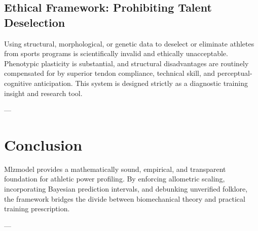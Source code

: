 \documentclass[11pt,a4paper]{article}
\begin{document}
\subsection{Ethical Framework: Prohibiting Talent Deselection}
Using structural, morphological, or genetic data to deselect or eliminate athletes from sports programs is scientifically invalid and ethically unacceptable. Phenotypic plasticity is substantial, and structural disadvantages are routinely compensated for by superior tendon compliance, technical skill, and perceptual-cognitive anticipation. This system is designed strictly as a diagnostic training insight and research tool.

---

\section{Conclusion}

Mlzmodel provides a mathematically sound, empirical, and transparent foundation for athletic power profiling. By enforcing allometric scaling, incorporating Bayesian prediction intervals, and debunking unverified folklore, the framework bridges the divide between biomechanical theory and practical training prescription.

---
\end{document}
